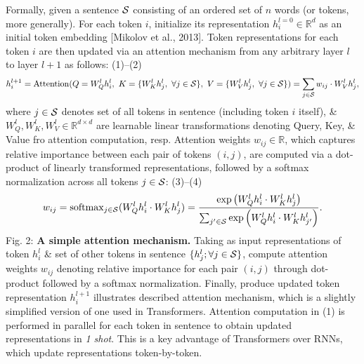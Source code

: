 \documentclass{article}
\begin{document}
\begin{itemize}
\begin{itemize}
        Formally, given a sentence ${\cal S}$ consisting of an ordered set of $n$ words (or tokens, more generally). For each token $i$, initialize its representation $h_i^{l=0}\in\mathbb{R}^d$ as an initial token embedding [Mikolov et al., 2013]. Token representations for each token $i$ are then updated via an attention mechanism from any arbitrary layer $l$ to layer $l + 1$ as follows: (1)--(2)
        \begin{equation*}
            h_i^{l + 1} = {\rm Attention}(Q = W_Q^lh_i^l,\ K = \{W_K^lh_j^l,\ \forall j\in{\cal S}\},\ V = \{W_V^lh_j^l,\ \forall j\in{\cal S}\}) = \sum_{j\in{\cal S}} w_{ij}\cdot W_V^lh_j^l,
        \end{equation*}
        where $j\in{\cal S}$ denotes set of all tokens in sentence (including token $i$ itself), \& $W_Q^l,W_K^l,W_V^l\in\mathbb{R}^{d\times d}$ are learnable linear transformations denoting Query, Key, \& Value fro attention computation, resp. Attention weights $w_{ij}\in\mathbb{R}$, which captures relative importance between each pair of tokens $(i,j)$, are computed via a dot-product of linearly transformed representations, followed by a softmax normalization across all tokens $j\in{\cal S}$: (3)--(4)
        \begin{equation*}
            w_{ij} = {\rm softmax}_{j\in{\cal S}} (W_Q^lh_i^l\cdot W_K^lh_j^l) = \frac{\exp\left(W_Q^lh_i^l\cdot W_K^lh_j^l\right)}{\sum_{j'\in{\cal S}} \exp\left(W_Q^lh_i^l\cdot W_K^lh_{j'}^l\right)}.
        \end{equation*}
        {\sf Fig. 2: {\bf A simple attention mechanism.} Taking as input representations of token $h_i^l$ \& set of other tokens in sentence $\{h_j^l;\forall j\in{\cal S}\}$, compute attention weights $w_{ij}$ denoting relative importance for each pair $(i,j)$ through dot-product followed by a softmax normalization. Finally, produce updated token representation $h_i^{l+1}$  } illustrates described attention mechanism, which is a slightly simplified version of one used in Transformers. Attention computation in (1) is performed in parallel for each token in sentence to obtain updated representations in {\it1 shot}. This is a key advantage of Transformers over RNNs, which update representations token-by-token.
        

\end{itemize}
\end{itemize}
\end{document}
